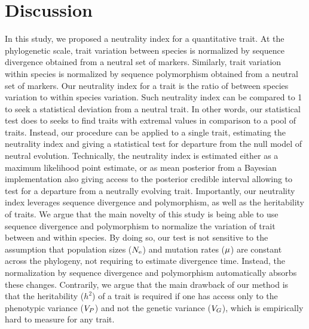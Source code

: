 \documentclass{article}
\begin{document}
\section{Discussion}\label{sec:discussion}

In this study, we proposed a neutrality index for a quantitative trait.
At the phylogenetic scale, trait variation between species is normalized by sequence divergence obtained from a neutral set of markers.
Similarly, trait variation within species is normalized by sequence polymorphism obtained from a neutral set of markers.
Our neutrality index for a trait is the ratio of between species variation to within species variation.
Such neutrality index can be compared to 1 to seek a statistical deviation from a neutral trait.
In other words, our statistical test does to seeks to find traits with extremal values in comparison to a pool of traits.
Instead, our procedure can be applied to a single trait, estimating the neutrality index and giving a statistical test for departure from the null model of neutral evolution.
Technically, the neutrality index is estimated either as a maximum likelihood point estimate, or as mean posterior from a Bayesian implementation also giving access to the posterior credible interval allowing to test for a departure from a neutrally evolving trait.
Importantly, our neutrality index leverages sequence divergence and polymorphism, as well as the heritability of traits.
We argue that the main novelty of this study is being able to use sequence divergence and polymorphism to normalize the variation of trait between and within species.
By doing so, our test is not sensitive to the assumption that population sizes ($N_{\text{e}}$) and mutation rates ($\mu$) are constant across the phylogeny, not requiring to estimate divergence time\cite{litsios_effects_2012}.
Instead, the normalization by sequence divergence and polymorphism automatically absorbs these changes\cite{seo_estimating_2004}.
Contrarily, we argue that the main drawback of our method is that the heritability ($h^2$) of a trait is required if one has access only to the phenotypic variance ($V_{P}$) and not the genetic variance ($V_{G}$), which is empirically hard to measure for any trait.
\end{document}
